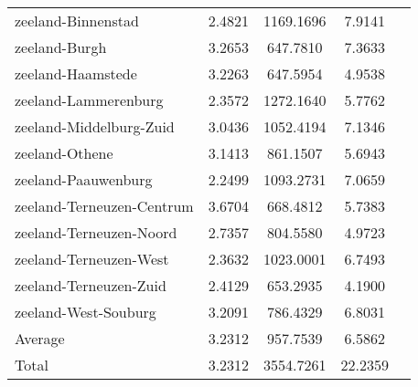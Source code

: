 \begin{longtable}{llccc}
zeeland-Binnenstad & 2.4821 & 1169.1696 & 7.9141 \\
zeeland-Burgh & 3.2653 & 647.7810 & 7.3633 \\
zeeland-Haamstede & 3.2263 & 647.5954 & 4.9538 \\
zeeland-Lammerenburg & 2.3572 & 1272.1640 & 5.7762 \\
zeeland-Middelburg-Zuid & 3.0436 & 1052.4194 & 7.1346 \\
zeeland-Othene & 3.1413 & 861.1507 & 5.6943 \\
zeeland-Paauwenburg & 2.2499 & 1093.2731 & 7.0659 \\
zeeland-Terneuzen-Centrum & 3.6704 & 668.4812 & 5.7383 \\
zeeland-Terneuzen-Noord & 2.7357 & 804.5580 & 4.9723 \\
zeeland-Terneuzen-West & 2.3632 & 1023.0001 & 6.7493 \\
zeeland-Terneuzen-Zuid & 2.4129 & 653.2935 & 4.1900 \\
zeeland-West-Souburg & 3.2091 & 786.4329 & 6.8031 \\
Average & 3.2312 & 957.7539 & 6.5862 \\
Total & 3.2312 & 3554.7261 & 22.2359 \\
\hline
\end{longtable}
